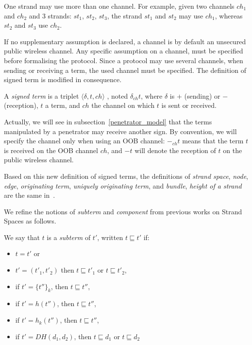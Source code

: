 One strand may use more than one channel.
For example, given two channels $ch_1$ and $ch_2$ and 3 strands: $st_1$, $st_2$, $st_3$, the strand $st_1$ and $st_2$ may use $ch_1$, whereas $st_2$ and $st_3$ use $ch_2$. 

If no supplementary assumption is declared, a channel is by default an unsecured public wireless channel. Any specific assumption on a channel, must be specified before formalising the protocol. Since a protocol may use several channels, when sending or receiving a term, the used channel must be specified. The definition of signed term is modified in consequence. 

\begin{Definition}
A \emph{signed term} is a triplet $\langle \delta, t, ch  \rangle$ , noted $\delta_{ch} t$, where $\delta$ is $+$ (sending) or $-$ (reception), $t$ a term, and $ch$ the channel on which $t$ is sent or received.
\end{Definition}

Actually, we will see in subsection~\ref{penetrator_model} that the terms manipulated by a penetrator may receive another sign.
By convention, we will specify the channel only when using an OOB channel: $-_{ch}t$ means that the term $t$ is received on the OOB channel $ch$, and $-t$ will denote the reception of $t$ on the public wireless channel.

Based on this new definition of signed terms, the definitions of \textit{strand space}, \textit{node}, \textit{edge}, \textit{originating term}, \textit{uniquely originating term}, and \textit{bundle}, \textit{height of a strand} are the same in~\cite{674832}. 

We refine the notions of \textit{subterm} and \textit{component} from previous works on Strand Spaces as follows.

\begin{Definition}[Subterm]
We say that $t$ is a \emph{subterm} of $t'$, written $t \sqsubseteq t'$ if:
\begin{itemize}
\item $t=t'$ or
\item $t'= (t'_1,t'_2)$ then $t \sqsubseteq t'_1$ or $t \sqsubseteq t'_2$,
\item if $t'={\{t''\}}_k$, then $t \sqsubseteq t''$,
\item if $t'=h(t'')$, then $t \sqsubseteq t''$,
\item if $t'=h_k(t'')$, then $t \sqsubseteq t''$,
\item if $t'=DH(d_1,d_2)$, then $t \sqsubseteq d_1$ or $t \sqsubseteq d_2$
\end{itemize}
\end{Definition}

